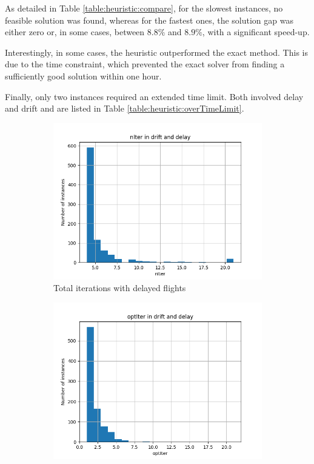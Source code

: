 \documentclass[../../thesis.tex]{subfiles}
\begin{document}
As detailed in Table \ref{table:heuristic:compare}, for the slowest instances, no feasible solution was found, whereas for the fastest ones, the solution gap was either zero or, in some cases, between $8.8\%$ and $8.9\%$, with a significant speed-up.

Interestingly, in some cases, the heuristic outperformed the exact method. This is due to the time constraint, which prevented the exact solver from finding a sufficiently good solution within one hour.

Finally, only two instances required an extended time limit. Both involved delay and drift and are listed in Table \ref{table:heuristic:overTimeLimit}.

\begin{figure}[ht]
    \centering
    \begin{subfigure}{0.49\textwidth}
        \centering
        \includegraphics[width=\linewidth]{thesis/picture/heuristic/nIter_histogram_DD.png}
        \caption{Total iterations with delayed flights}
        \label{fig:heurDD:nIter}
    \end{subfigure}
    \hfill
    \begin{subfigure}{0.49\textwidth}
        \centering
        \includegraphics[width=\linewidth]{thesis/picture/heuristic/optIter_histogram_DD.png}

\end{subfigure}
\end{figure}
\end{document}
